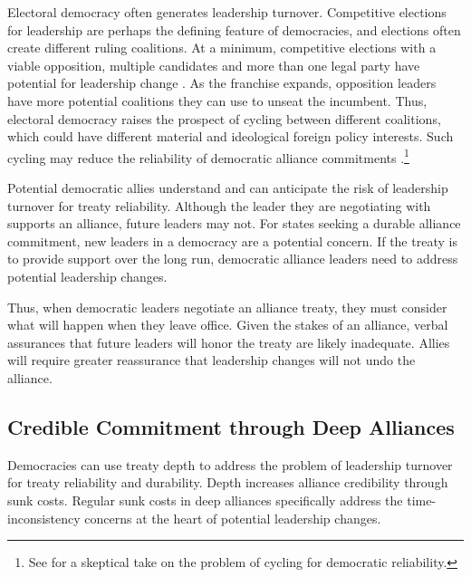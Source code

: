 \documentclass[12pt]{article}
\begin{document}
Electoral democracy often generates leadership turnover. 
Competitive elections for leadership are perhaps the defining feature of democracies, and elections often create different ruling coalitions. 
At a minimum, competitive elections with a viable opposition, multiple candidates and more than one legal party have potential for leadership change \citep{HydeMarinov2012}. 
As the franchise expands, opposition leaders have more potential coalitions they can use to unseat the incumbent.  
Thus, electoral democracy raises the prospect of cycling between different coalitions, which could have different material and ideological foreign policy interests. 
Such cycling may reduce the reliability of democratic alliance commitments \citep{GartzkeGleditsch2004}.\footnote{See \citet{Gaubatz1996} for a skeptical take on the problem of cycling for democratic reliability.}


Potential democratic allies understand and can anticipate the risk of leadership turnover for treaty reliability. 
Although the leader they are negotiating with supports an alliance, future leaders may not. 
For states seeking a durable alliance commitment, new leaders in a democracy are a potential concern. 
If the treaty is to provide support over the long run, democratic alliance leaders need to address potential leadership changes.


Thus, when democratic leaders negotiate an alliance treaty, they must consider what will happen when they leave office.
Given the stakes of an alliance, verbal assurances that future leaders will honor the treaty are likely inadequate.
Allies will require greater reassurance that leadership changes will not undo the alliance. 



\subsection{Credible Commitment through Deep Alliances}

Democracies can use treaty depth to address the problem of leadership turnover for treaty reliability and durability. 
Depth increases alliance credibility through sunk costs.
Regular sunk costs in deep alliances specifically address the time-inconsistency concerns at the heart of potential leadership changes.
\end{document}
